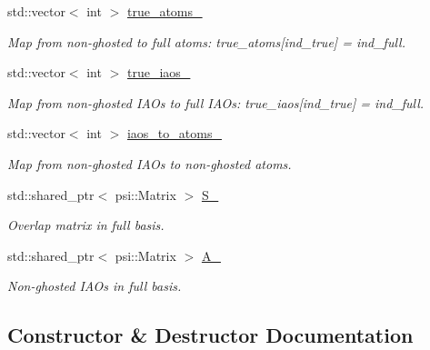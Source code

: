 \begin{DoxyCompactItemize}
std\+::vector$<$ int $>$ \mbox{\hyperlink{classforte_1_1_i_a_o_builder_abe6d148ff4baa3e97f30bb7be7ce0a01}{true\+\_\+atoms\+\_\+}}
\begin{DoxyCompactList}\small\item\em Map from non-\/ghosted to full atoms\+: true\+\_\+atoms\mbox{[}ind\+\_\+true\mbox{]} = ind\+\_\+full. \end{DoxyCompactList}\item 
std\+::vector$<$ int $>$ \mbox{\hyperlink{classforte_1_1_i_a_o_builder_a5e71c7ff30ee808956470090bd2afbc7}{true\+\_\+iaos\+\_\+}}
\begin{DoxyCompactList}\small\item\em Map from non-\/ghosted I\+A\+Os to full I\+A\+Os\+: true\+\_\+iaos\mbox{[}ind\+\_\+true\mbox{]} = ind\+\_\+full. \end{DoxyCompactList}\item 
std\+::vector$<$ int $>$ \mbox{\hyperlink{classforte_1_1_i_a_o_builder_a9d06de71a939afb628318e742c39f9fd}{iaos\+\_\+to\+\_\+atoms\+\_\+}}
\begin{DoxyCompactList}\small\item\em Map from non-\/ghosted I\+A\+Os to non-\/ghosted atoms. \end{DoxyCompactList}\item 
std\+::shared\+\_\+ptr$<$ psi\+::\+Matrix $>$ \mbox{\hyperlink{classforte_1_1_i_a_o_builder_a76f50429a95fe8df4bb4d9afec865d8d}{S\+\_\+}}
\begin{DoxyCompactList}\small\item\em Overlap matrix in full basis. \end{DoxyCompactList}\item 
std\+::shared\+\_\+ptr$<$ psi\+::\+Matrix $>$ \mbox{\hyperlink{classforte_1_1_i_a_o_builder_a91b9d32510afff7c23238e0421a1ba60}{A\+\_\+}}
\begin{DoxyCompactList}\small\item\em Non-\/ghosted I\+A\+Os in full basis. \end{DoxyCompactList}\end{DoxyCompactItemize}


\subsection{Constructor \& Destructor Documentation}
\mbox{\label{classforte_1_1_i_a_o_builder_a0d7313fecbe0dab3d009ee61460a7ec7}} 
